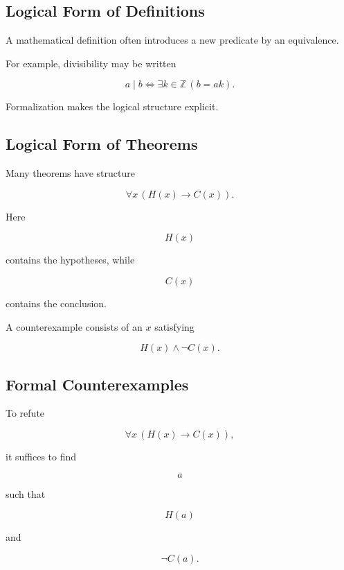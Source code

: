\subsection{Logical Form of Definitions}
\label{subsec:logical-form-definitions}

A mathematical definition often introduces a new predicate by an
equivalence.

For example, divisibility may be written

\[
\boxed{
a\mid b
\iff
\exists k\in\mathbb{Z}
\,
(b=ak).
}
\]

Formalization makes the logical structure explicit.

\subsection{Logical Form of Theorems}
\label{subsec:logical-form-theorems}

Many theorems have structure

\[
\boxed{
\forall x
\,
(
H(x)
\rightarrow
C(x)
).
}
\]

Here

\[
H(x)
\]

contains the hypotheses, while

\[
C(x)
\]

contains the conclusion.

A counterexample consists of an \(x\) satisfying

\[
\boxed{
H(x)\land\neg C(x).
}
\]

\subsection{Formal Counterexamples}
\label{subsec:formal-counterexamples}

To refute

\[
\forall x
\,
(H(x)\rightarrow C(x)),
\]

it suffices to find

\[
a
\]

such that

\[
\boxed{
H(a)
}
\]

and

\[
\boxed{
\neg C(a).
}
\]

